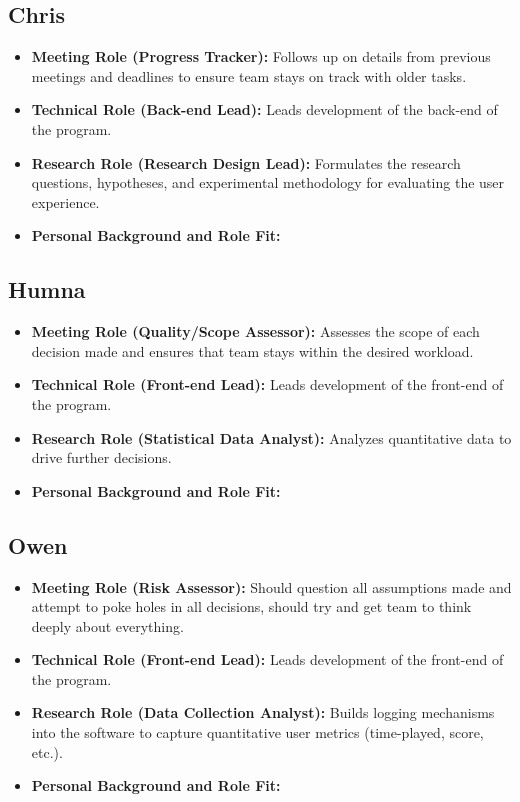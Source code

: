 \subsection{Chris}
\begin{itemize}
\item \textbf{Meeting Role (Progress Tracker):} Follows up on details from previous meetings and deadlines to ensure team stays on track with older tasks.
\item \textbf{Technical Role (Back-end Lead):} Leads development of the back-end of the program.
\item \textbf{Research Role (Research Design Lead):} Formulates the research questions, hypotheses, and experimental methodology for evaluating the user experience.
\item \textbf{Personal Background and Role Fit:} 
\end{itemize}

\subsection{Humna}
\begin{itemize}
\item \textbf{Meeting Role (Quality/Scope Assessor):} Assesses the scope of each decision made and ensures that team stays within the desired workload.
\item \textbf{Technical Role (Front-end Lead):} Leads development of the front-end of the program.
\item \textbf{Research Role (Statistical Data Analyst):} Analyzes quantitative data to drive further decisions.
\item \textbf{Personal Background and Role Fit:} 
\end{itemize}

\subsection{Owen}
\begin{itemize}
\item \textbf{Meeting Role (Risk Assessor):} Should question all assumptions made and attempt to poke holes in all decisions, should try and get team to think deeply about everything.
\item \textbf{Technical Role (Front-end Lead):} Leads development of the front-end of the program.
\item \textbf{Research Role (Data Collection Analyst):} Builds logging mechanisms into the software to capture quantitative user metrics (time-played, score, etc.).
\item \textbf{Personal Background and Role Fit:} 
\end{itemize}

